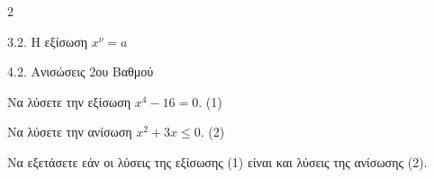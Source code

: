 \begin{ylh}{2}
    \item 3.2. Η εξίσωση $x^{\nu}=a$
    \item 4.2. Ανισώσεις 2ου Βαθμού
\end{ylh}

\begin{alist}
\item Να λύσετε την εξίσωση $x^4 - 16 = 0$. (1)
\item Να λύσετε την ανίσωση $x^2 + 3x \le 0$. (2)
\item Να εξετάσετε εάν οι λύσεις της εξίσωσης (1) είναι και λύσεις της ανίσωσης (2).
\end{alist}

